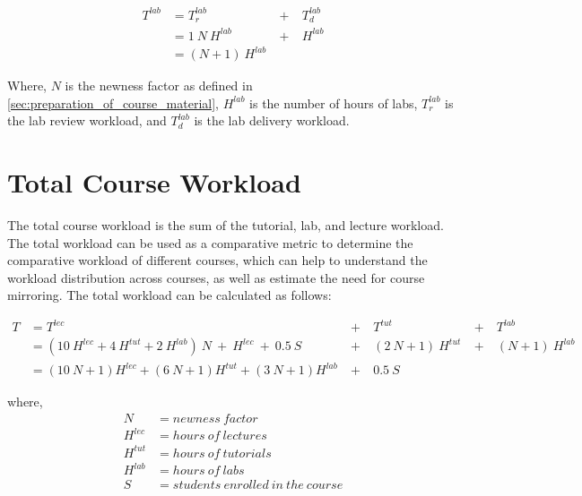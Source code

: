 \begin{equation}
  \begin{aligned}
    T^{lab} & = T_r^{lab}        & \ +\  & T_d^{lab} \\
            & = 1\ N\ H^{lab}    & \ +\  & H^{lab}   \\
            & = (N + 1)\ H^{lab}
  \end{aligned}
  \label{eqn:lab-workload}
\end{equation}

Where, \(N\) is the newness factor as defined in \autoref{sec:preparation_of_course_material}, \(H^{lab}\) is the number of hours of labs, \(T_r^{lab}\) is the lab review workload, and \(T_d^{lab}\) is the lab delivery workload.

\section{Total Course Workload}

The total course workload is the sum of the tutorial, lab, and lecture workload. The total workload can be used as a comparative metric to determine the comparative workload of different courses, which can help to understand the workload distribution across courses, as well as estimate the need for course mirroring. The total workload can be calculated as follows:

\begin{equation}
  \label{eqn:total-course-workload}
  \begin{aligned}
    T & = T^{lec}                                                               & \ +\  & T^{tut}             & \ +\  & T^{lab}          \\
      & = (10\ H^{lec} + 4\ H^{tut} + 2\ H^{lab})\ N\ +\ H^{lec}  \ +\   0.5\ S & \ +\  & (2\ N + 1)\ H^{tut} & \ +\  & (N + 1)\ H^{lab} \\
      & = (10\ N + 1)H^{lec} + (6\ N + 1)H^{tut} + (3\ N + 1)H^{lab}            & \ +\  & 0.5\ S
  \end{aligned}
\end{equation}

where,
\begin{equation*}
  \nonumber
  \begin{aligned}
    N       & = newness\ factor                     \\
    H^{lec} & = hours\ of\ lectures                 \\
    H^{tut} & = hours\ of\ tutorials                \\
    H^{lab} & = hours\ of\ labs                     \\
    S       & = students\ enrolled\ in\ the\ course
  \end{aligned}
\end{equation*}

